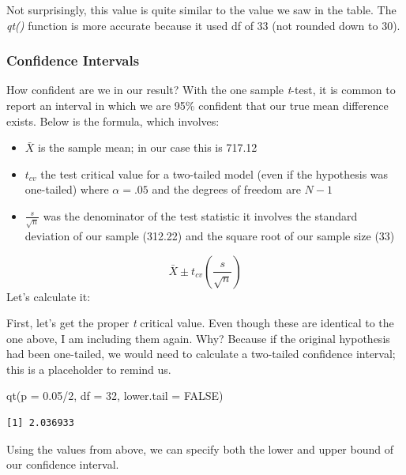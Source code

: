 \documentclass[
  11pt,
]{book}
\newenvironment{Shaded}{\begin{snugshade}}{\end{snugshade}}
\newcommand{\AttributeTok}[1]{\textcolor[rgb]{0.77,0.63,0.00}{#1}}
\newcommand{\ConstantTok}[1]{\textcolor[rgb]{0.00,0.00,0.00}{#1}}
\newcommand{\DecValTok}[1]{\textcolor[rgb]{0.00,0.00,0.81}{#1}}
\newcommand{\FloatTok}[1]{\textcolor[rgb]{0.00,0.00,0.81}{#1}}
\newcommand{\FunctionTok}[1]{\textcolor[rgb]{0.00,0.00,0.00}{#1}}
\newcommand{\NormalTok}[1]{#1}
\newcommand{\SpecialCharTok}[1]{\textcolor[rgb]{0.00,0.00,0.00}{#1}}
\providecommand{\tightlist}{%
  \setlength{\itemsep}{0pt}\setlength{\parskip}{0pt}}
\begin{document}
Not surprisingly, this value is quite similar to the value we saw in the table. The \emph{qt()} function is more accurate because it used df of 33 (not rounded down to 30).

\hypertarget{confidence-intervals}{%
\subsubsection{Confidence Intervals}\label{confidence-intervals}}

How confident are we in our result? With the one sample \emph{t}-test, it is common to report an interval in which we are 95\% confident that our true mean difference exists. Below is the formula, which involves:

\begin{itemize}
\tightlist
\item
  \(\bar{X}\) is the sample mean; in our case this is 717.12
\item
  \(t_{cv}\) the test critical value for a two-tailed model (even if the hypothesis was one-tailed) where \(\alpha = .05\) and the degrees of freedom are \(N-1\)
\item
  \(\frac{s}{\sqrt{n}}\) was the denominator of the test statistic it involves the standard deviation of our sample (312.22) and the square root of our sample size (33)
\end{itemize}

\[\bar{X} \pm t_{cv}(\frac{s}{\sqrt{n}})\]
Let's calculate it:

First, let's get the proper \emph{t} critical value. Even though these are identical to the one above, I am including them again. Why? Because if the original hypothesis had been one-tailed, we would need to calculate a two-tailed confidence interval; this is a placeholder to remind us.

\begin{Shaded}
\begin{Highlighting}[]
\FunctionTok{qt}\NormalTok{(}\AttributeTok{p =} \FloatTok{0.05}\SpecialCharTok{/}\DecValTok{2}\NormalTok{, }\AttributeTok{df =} \DecValTok{32}\NormalTok{, }\AttributeTok{lower.tail =} \ConstantTok{FALSE}\NormalTok{)}
\end{Highlighting}
\end{Shaded}

\begin{verbatim}
[1] 2.036933
\end{verbatim}

Using the values from above, we can specify both the lower and upper bound of our confidence interval.
\end{document}
